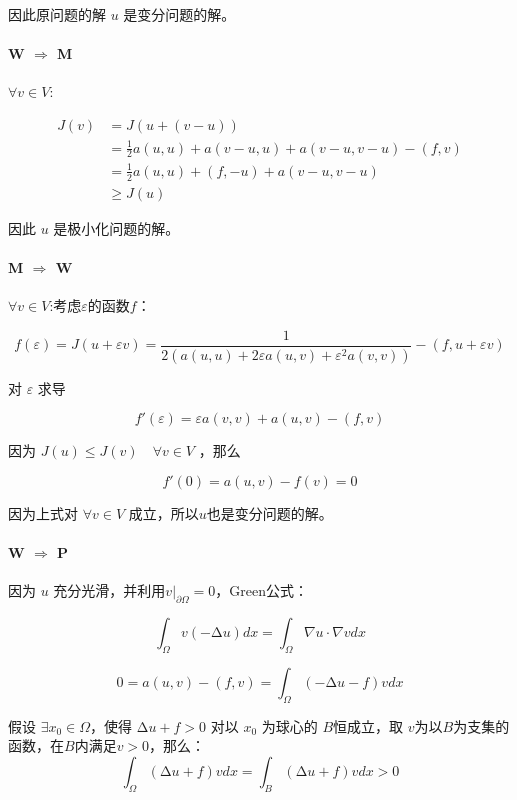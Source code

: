 \documentclass[UTF8]{ctexart}
\begin{document}
因此原问题的解 \(u\) 是变分问题的解。

\paragraph{{W \(\Rightarrow\)
M}}

\(\forall v \in V\):

\[\begin{aligned}
J(v) & = J\left( u + (v - u) \right) \\
 & = \frac{1}{2}a(u,u) + a(v - u,u) + a(v - u,v - u) - (f,v) \\
 & = \frac{1}{2}a(u,u) + (f, - u) + a(v - u,v - u) \\
 & \geq J(u)
\end{aligned}\]

因此 \(u\) 是极小化问题的解。

\paragraph{{M \(\Rightarrow\)
W}}

\(\forall v \in V\):考虑\(\varepsilon\)的函数\(f\)：

\[f(\varepsilon) = J(u + \varepsilon v) = \frac{1}{2\left( a(u,u) + 2\varepsilon a(u,v) + \varepsilon^{2}a(v,v) \right)} - (f,u + \varepsilon v)\]

对 \(\varepsilon\) 求导

\[f\prime(\varepsilon) = \varepsilon a(v,v) + a(u,v) - (f,v)\]

因为 \(J(u) \leq J(v)\quad\forall v \in V\) ，那么

\[f\prime(0) = a(u,v) - f(v) = 0\]

因为上式对 \(\forall v \in V\) 成立，所以\(u\)也是变分问题的解。

\paragraph{{W \(\Rightarrow\)
P}}

因为 \(u\) 充分光滑，并利用\(v|_{\partial\Omega} = 0\)，Green公式：

\[\int_{\Omega}v( - \mathrm{\Delta}u)dx = \int_{\Omega}\nabla u \cdot \nabla vdx\]

\[0 = a(u,v) - (f,v) = \int_{\Omega}( - \mathrm{\Delta}u - f)vdx\]

假设 \(\exists x_{0} \in \Omega\)，使得 \(\mathrm{\Delta}u + f > 0\)
对以 \(x_{0}\) 为球心的 \(B\)恒成立，取
\(v\)为以\(B\)为支集的函数，在\(B\)内满足\(v > 0\)，那么：
\[\int_{\Omega}(\mathrm{\Delta}u + f)vdx = \int_{B}(\mathrm{\Delta}u + f)vdx > 0\]
\end{document}
